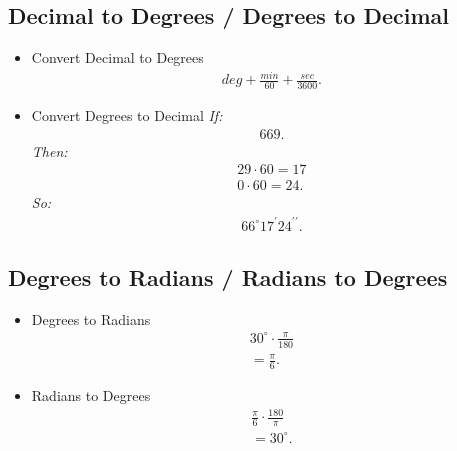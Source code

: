 \documentclass{report}
\begin{document}
        \bigbreak \noindent \bigbreak \noindent 
        \subsection{Decimal to Degrees / Degrees to Decimal }
        \begin{itemize}
        \item Convert Decimal to Degrees
          \begin{align*}
            deg + \frac{min}{60} + \frac{sec}{3600}
          .\end{align*}
        \item Convert Degrees to Decimal
          \bigbreak \noindent 
          \textit{If:}
          \begin{align*}
            669 
          .\end{align*}
          \bigbreak \noindent 
          \textit{Then:}
          \begin{align*}
            29 \cdot 60 = 17 \\
            0 \cdot 60 = 24
          .\end{align*}
          \bigbreak \noindent 
          \textit{So:}
          \begin{align*}
            66^{\circ} 17^{\prime} 24^{\prime\prime}
          .\end{align*}
        \end{itemize}

        \bigbreak \noindent \bigbreak \noindent 
        \subsection{Degrees to Radians / Radians to Degrees}
        \begin{itemize}
        \item Degrees to Radians
          \begin{align*}
            30^{\circ} \cdot \frac{\pi}{180} \\
            = \frac{\pi}{6}
          .\end{align*}
        \item Radians to Degrees
          \begin{align*}
            \frac{\pi}{6} \cdot \frac{180}{\pi} \\
            = 30^{\circ}
          .\end{align*}
        \end{itemize}

        \bigbreak \noindent \bigbreak \noindent 
\end{document}
